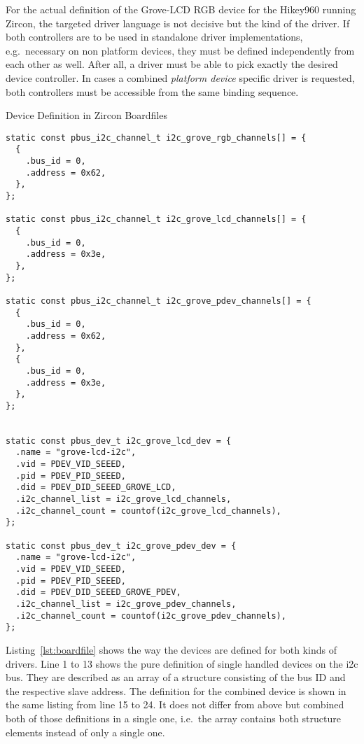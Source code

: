 For the actual definition of the Grove-LCD RGB device for the Hikey960 running Zircon, the targeted driver language is not decisive but the kind of the driver.
If both controllers are to be used in standalone driver implementations, e.g.\ necessary on non platform devices, they must be defined independently from each other as well.
After all, a driver must be able to pick exactly the desired device controller.
In cases a combined \textit{platform device} specific driver is requested, both controllers must be accessible from the same binding sequence.
%
\begin{listing} [H]
\caption{Device Definition in Zircon Boardfiles}
\label{lst:boardfile}
\begin{verbatim}
static const pbus_i2c_channel_t i2c_grove_rgb_channels[] = {
  {
    .bus_id = 0,
    .address = 0x62,
  },
};

static const pbus_i2c_channel_t i2c_grove_lcd_channels[] = {
  {
    .bus_id = 0,
    .address = 0x3e,
  },
}; 

static const pbus_i2c_channel_t i2c_grove_pdev_channels[] = {
  {
    .bus_id = 0,
    .address = 0x62,
  },
  {
    .bus_id = 0,
    .address = 0x3e,
  },
};


static const pbus_dev_t i2c_grove_lcd_dev = {
  .name = "grove-lcd-i2c",
  .vid = PDEV_VID_SEEED,              
  .pid = PDEV_PID_SEEED,              
  .did = PDEV_DID_SEEED_GROVE_LCD,    
  .i2c_channel_list = i2c_grove_lcd_channels,
  .i2c_channel_count = countof(i2c_grove_lcd_channels),
}; 

static const pbus_dev_t i2c_grove_pdev_dev = {
  .name = "grove-lcd-i2c",
  .vid = PDEV_VID_SEEED,              
  .pid = PDEV_PID_SEEED,              
  .did = PDEV_DID_SEEED_GROVE_PDEV,  
  .i2c_channel_list = i2c_grove_pdev_channels,
  .i2c_channel_count = countof(i2c_grove_pdev_channels),
};
\end{verbatim}
\end{listing}
%
Listing~\ref{lst:boardfile} shows the way the devices are defined for both kinds of drivers.
Line 1 to 13 shows the pure definition of single handled devices on the \ac{i2c} bus.
They are described as an array of a structure consisting of the bus ID and the respective slave address.
The definition for the combined device is shown in the same listing from line 15 to 24. 
It does not differ from above but combined both of those definitions in a single one, i.e.\ the array contains both structure elements instead of only a single one.
